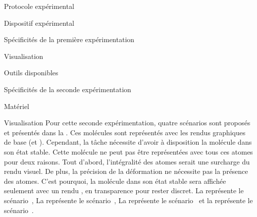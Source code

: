 \documentclass[myfrancais]{mythesis}
\begin{document}
\begin{mychapter}{Protocole expérimental}
\begin{mysection}{Dispositif expérimental}
\begin{mysubsection}{Spécificités de la première expérimentation}
\begin{mysubsubsection}{Visualisation}
					\begin{myfigure}
					\end{myfigure}
				\end{mysubsubsection}
				\begin{mysubsubsection}{Outils disponibles}
				\end{mysubsubsection}
			\end{mysubsection}
			\begin{mysubsection}{Spécificités de la seconde expérimentation}
				\begin{mysubsubsection}{Matériel}
				\end{mysubsubsection}
				\begin{mysubsubsection}{Visualisation}
					Pour cette seconde expérimentation, quatre scénarios sont proposés et présentés dans la .
					Ces molécules sont représentés avec les rendus graphiques de base (\myCPK et \myNewRibbon).
					Cependant, la tâche nécessite d'avoir à disposition la molécule dans son état stable.
					Cette molécule ne peut pas être représentées avec tous ces atomes pour deux raisons.
					Tout d'abord, l'intégralité des atomes serait une surcharge du rendu visuel.
					De plus, la précision de la déformation ne nécessite pas la présence des atomes.
					C'est pourquoi, la molécule dans son état stable sera affichée seulement avec un rendu \myNewRibbon, en transparence pour rester discret.
					La  représente le scénario~, La  représente le scénario~, La  représente le scénario~ et la  représente le scénario~.


\end{mysubsubsection}
\end{mysubsection}
\end{mysection}
\end{mychapter}
\end{document}
